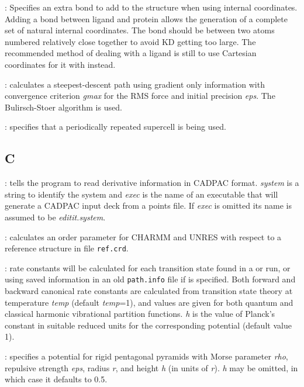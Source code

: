 {{: Specifies an extra bond to add to the structure when
  using internal coordinates. Adding a bond between ligand and protein allows the generation of a complete set
  of natural
  internal coordinates. The bond should be between two atoms numbered
  relatively close together to avoid KD getting too large. The recommended
  method of dealing with a ligand is still to use Cartesian coordinates for it
  with {} instead.
 
: calculates a steepest-descent path using gradient only
      information with convergence criterion {\it gmax\/} for the RMS force and initial
      precision {\it eps\/}. The Bulirsch-Stoer algorithm is used.

: specifies that a periodically repeated supercell is being used.



\subsection{C}

: tells the program to read derivative information in
CADPAC format. {\it system\/} is a string to identify the system and {\it exec\/} is
the name of an executable that will generate a CADPAC input deck from a points file.
If {\it exec\/} is omitted its name is assumed to be {\it editit.system}.

: calculates an order parameter for CHARMM and UNRES with respect to
a reference structure in file {\tt ref.crd}.

: rate constants will be calculated for each transition state
found in a  or  run, or using saved information in an
old {\tt path.info} file if {} is specified. Both forward and backward canonical
rate constants are calculated from transition state theory at temperature {\it temp\/} (default
{\it temp\/}=1), and values are given
for both quantum and classical harmonic vibrational partition functions. {\it h\/} is the
value of Planck's constant in suitable reduced units for the corresponding potential (default value 1).


: specifies a potential for rigid pentagonal pyramids with
Morse parameter {\it rho}, repulsive strength {\it eps}, radius {\it r}, and height {\it h} (in
units of {\it r}).
{\it h} may be omitted, in which case it defaults to 0.5.

}}
